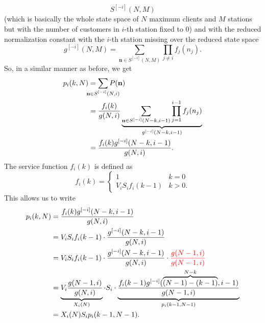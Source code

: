 \documentclass[12pt,a4paper]{article}
\begin{document}
	\begin{equation*}
		S^{[-i]}(N,M)
	\end{equation*}
	(which is basically the whole state space of $N$ maximum clients and $M$ stations but with the number of customers in $i$-th station fixed to 0) and with the reduced normalization constant with the $i$-th station missing over the reduced state space
	\begin{equation*}
		g^{[-i]}(N,M)=\sum_{\mathbf{n}\in S^{[-i]}(N,M)}\prod_{{j\neq i}}f_j(n_j).
	\end{equation*}
	So, in a similar manner as before, we get
	\begin{align*}
		p_i(k,N)&=\sum_{\mathclap{\mathbf{n}\in S^{[-i]}(N,i)}}P(\mathbf{n})\\
		&=\frac{f_i(k)}{g(N,i)}\underbrace{\sum_{\mathbf{n}\in S^{[-i]}(N-k,i-1)}\prod_{j=1}^{i-1}f_j(n_j)}_{g^{[-i]}(N-k,i-1)}\\
		&=\frac{f_i(k)g^{[-i]}(N-k,i-1)}{g(N,i)}.
	\end{align*}
	The service function $f_i(k)$ is defined as
	\begin{equation*}
		f_{i}(k)=\begin{cases}
			1&k=0\\
			V_iS_if_i(k-1) &k>0.
		\end{cases}
	\end{equation*}
	This allows us to write
	\begin{align*}
		p_i(k,N) &= \frac{f_i(k)g^{[-i]}(N-k,i-1)}{g(N,i)} \\
		&= 	V_iS_if_i(k-1)\cdot\frac{g^{[-i]}(N-k,i-1)}{g(N,i)}\\
		&=V_iS_if_i(k-1)\cdot\frac{g^{[-i]}(N-k,i-1)}{g(N,i)}\cdot\color{red}\frac{g(N-1,i)}{g(N-1,i)}\\
		&=\underbrace{V_i\frac{g(N-1,i)}{g(N,i)}}_{X_i(N)}\cdot S_i\cdot\underbrace{\frac{ f_i(k-1)g^{[-i]}(\overbrace{(N-1)-(k-1)}^{N-k},i-1)}{g(N-1,i)}}_{p_i(k-1,N-1)}\\
		&=X_i(N)S_ip_i(k-1,N-1).
	\end{align*}
\end{document}
